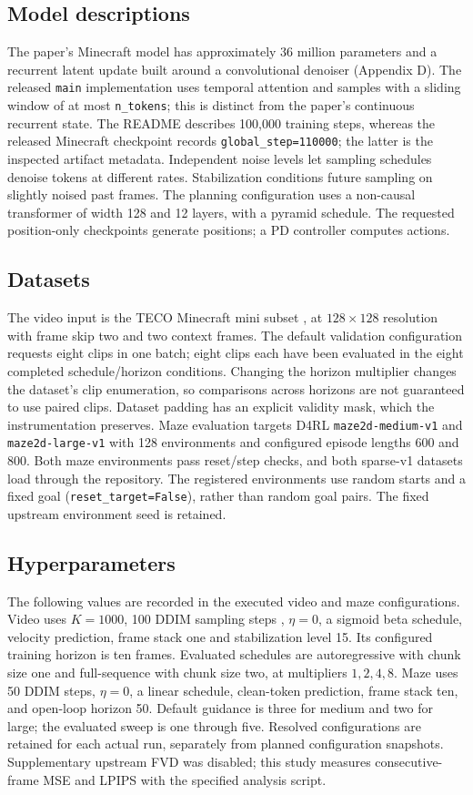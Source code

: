 \subsection{Model descriptions}
The paper's Minecraft model has approximately 36 million parameters and a recurrent latent update built around a convolutional denoiser (Appendix D). The released \texttt{main} implementation uses temporal attention and samples with a sliding window of at most \texttt{n\_tokens}; this is distinct from the paper's continuous recurrent state. The README describes 100,000 training steps, whereas the released Minecraft checkpoint records \texttt{global\_step=110000}; the latter is the inspected artifact metadata. Independent noise levels let sampling schedules denoise tokens at different rates. Stabilization conditions future sampling on slightly noised past frames. The planning configuration uses a non-causal transformer of width 128 and 12 layers, with a pyramid schedule. The requested position-only checkpoints generate positions; a PD controller computes actions.
\subsection{Datasets}
The video input is the TECO Minecraft mini subset \cite{yan2023teco}, at $128\times128$ resolution with frame skip two and two context frames. The default validation configuration requests eight clips in one batch; eight clips each have been evaluated in the eight completed schedule/horizon conditions. Changing the horizon multiplier changes the dataset's clip enumeration, so comparisons across horizons are not guaranteed to use paired clips. Dataset padding has an explicit validity mask, which the instrumentation preserves. Maze evaluation targets D4RL \texttt{maze2d-medium-v1} and \texttt{maze2d-large-v1} \cite{fu2020d4rl} with 128 environments and configured episode lengths 600 and 800. Both maze environments pass reset/step checks, and both sparse-v1 datasets load through the repository. The registered environments use random starts and a fixed goal (\texttt{reset\_target=False}), rather than random goal pairs. The fixed upstream environment seed is retained.
\subsection{Hyperparameters}
The following values are recorded in the executed video and maze configurations. Video uses $K=1000$, 100 DDIM sampling steps \cite{song2021ddim}, $\eta=0$, a sigmoid beta schedule, velocity prediction, frame stack one and stabilization level 15. Its configured training horizon is ten frames. Evaluated schedules are autoregressive with chunk size one and full-sequence with chunk size two, at multipliers $1,2,4,8$. Maze uses 50 DDIM steps, $\eta=0$, a linear schedule, clean-token prediction, frame stack ten, and open-loop horizon 50. Default guidance is three for medium and two for large; the evaluated sweep is one through five. Resolved configurations are retained for each actual run, separately from planned configuration snapshots. Supplementary upstream FVD was disabled; this study measures consecutive-frame MSE and LPIPS with the specified analysis script.

